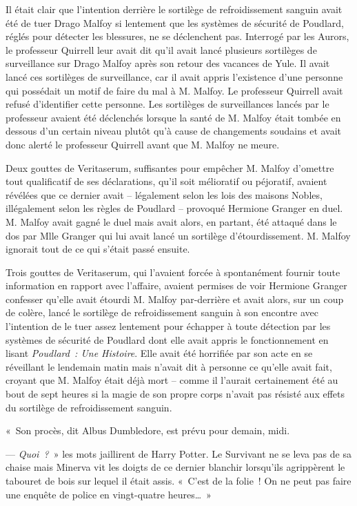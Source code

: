 Il était clair que l'intention derrière le sortilège de refroidissement sanguin avait été de tuer Drago Malfoy si lentement que les systèmes de sécurité de Poudlard, réglés pour détecter les blessures, ne se déclenchent pas. Interrogé par les Aurors, le professeur Quirrell leur avait dit qu'il avait lancé plusieurs sortilèges de surveillance sur Drago Malfoy après son retour des vacances de Yule. Il avait lancé ces sortilèges de surveillance, car il avait appris l'existence d'une personne qui possédait un motif de faire du mal à M. Malfoy. Le professeur Quirrell avait refusé d'identifier cette personne. Les sortilèges de surveillances lancés par le professeur avaient été déclenchés lorsque la santé de M. Malfoy était tombée en dessous d'un certain niveau plutôt qu'à cause de changements soudains et avait donc alerté le professeur Quirrell avant que M. Malfoy ne meure.

Deux gouttes de Veritaserum, suffisantes pour empêcher M. Malfoy d'omettre tout qualificatif de ses déclarations, qu'il soit mélioratif ou péjoratif, avaient révélées que ce dernier avait -- légalement selon les lois des maisons Nobles, illégalement selon les règles de Poudlard -- provoqué Hermione Granger en duel. M. Malfoy avait gagné le duel mais avait alors, en partant, été attaqué dans le dos par Mlle Granger qui lui avait lancé un sortilège d'étourdissement. M. Malfoy ignorait tout de ce qui s'était passé ensuite.

Trois gouttes de Veritaserum, qui l'avaient forcée à spontanément fournir toute information en rapport avec l'affaire, avaient permises de voir Hermione Granger confesser qu'elle avait étourdi M. Malfoy par-derrière et avait alors, sur un coup de colère, lancé le sortilège de refroidissement sanguin à son encontre avec l'intention de le tuer assez lentement pour échapper à toute détection par les systèmes de sécurité de Poudlard dont elle avait appris le fonctionnement en lisant \emph{Poudlard~: Une Histoire}. Elle avait été horrifiée par son acte en se réveillant le lendemain matin mais n'avait dit à personne ce qu'elle avait fait, croyant que M. Malfoy était déjà mort -- comme il l'aurait certainement été au bout de sept heures si la magie de son propre corps n'avait pas résisté aux effets du sortilège de refroidissement sanguin.

«~Son procès, dit Albus Dumbledore, est prévu pour demain, midi.

--- \emph{Quoi~?}~» les mots jaillirent de Harry Potter. Le Survivant ne se leva pas de sa chaise mais Minerva vit les doigts de ce dernier blanchir lorsqu'ils agrippèrent le tabouret de bois sur lequel il était assis. «~C'est de la folie~! On ne peut pas faire une enquête de police en vingt-quatre heures…~»

